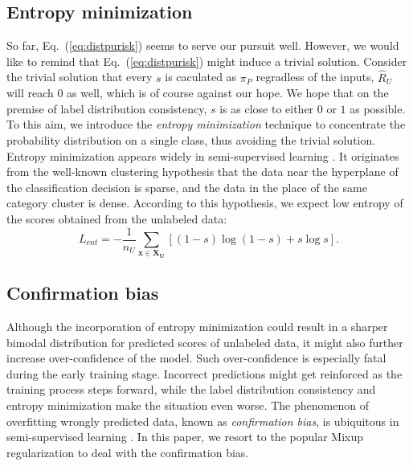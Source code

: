\documentclass[final]{cvpr}
\newcommand{\examplex}{\bm{x}}
\newcommand{\usubset}{\bm{X_{U}}}
\newcommand{\bangyan}[1]{#1}
\begin{document}

\subsection{Entropy minimization}
So far, Eq.~(\ref{eq:distpurisk}) seems to serve our pursuit well. However, we would like to remind that Eq.~(\ref{eq:distpurisk}) might induce a trivial solution. Consider the trivial solution that every $s$ is caculated as $\pi_{P}$ regradless of the inputs, $\hat{R}_{U}$ will reach $0$ as well, which is of course against our hope. We hope that on the premise of label distribution consistency, $s$ is as close to either $0$ or $1$ as possible. To this aim, we introduce the \textit{entropy minimization} technique to concentrate the probability distribution on a single class, thus avoiding the trivial solution. Entropy minimization appears widely in semi-supervised learning \cite{DBLP:conf/nips/GrandvaletB04,DBLP:conf/nips/XieDHL020,DBLP:conf/nips/BerthelotCGPOR19,DBLP:conf/iclr/BerthelotCCKSZR20}. It originates from the well-known clustering hypothesis that the data near the hyperplane of the classification decision is sparse, and the data in the place of the same category cluster is dense. According to this hypothesis, we expect low entropy of the scores obtained from the unlabeled data: 
\begin{equation}
    L_{ent} = -\frac{1}{n_{U}} \sum_{\examplex \in \usubset} \left[ (1-s) \log{(1-s)} + s \log{s} \right]. \label{eq:ent}
\end{equation}

\subsection{Confirmation bias}
Although \bangyan{the incorporation of entropy minimization could result in a sharper bimodal distribution for predicted scores of unlabeled data, it might also further increase over-confidence of the model. Such over-confidence is especially fatal during the early training stage.} Incorrect predictions might get reinforced as the training process steps forward, while the label distribution consistency and entropy minimization make the situation even worse. \bangyan{The phenomenon of} overfitting wrongly predicted data, known as \textit{confirmation bias}, is \bangyan{ubiquitous} in semi-supervised learning \cite{DBLP:conf/ijcnn/ArazoOAOM20, DBLP:conf/iclr/LiSH20}. \bangyan{In this paper, we resort to the popular Mixup regularization \cite{DBLP:conf/iclr/ZhangCDL18} to deal with the confirmation bias.}
\end{document}
